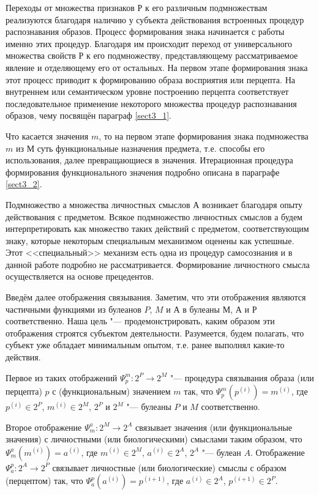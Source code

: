 Переходы от множества признаков $Р$ к его различным подмножествам реализуются благодаря наличию у субъекта действования встроенных процедур распознавания образов. Процесс формирования знака начинается с работы именно этих процедур. Благодаря им происходит переход от универсального множества свойств $Р$ к его подмножеству, представляющему рассматриваемое явление и отделяющему его от остальных. На первом этапе формирования знака этот процесс приводит к формированию образа восприятия или перцепта. На внутреннем или семантическом уровне построению перцепта соответствует последовательное применение некоторого множества процедур распознавания образов, чему посвящён параграф \ref{sect3_1}.

Что касается значения $m$, то на первом этапе формирования знака подмножества $m$ из $М$ суть функциональные назначения предмета, т.е. способы его использования, далее превращающиеся в значения. Итерационная процедура формирования функционального значения подробно описана в параграфе \ref{sect3_2}.

Подмножество $а$ множества личностных смыслов $А$ возникает благодаря опыту действования с предметом. Всякое подмножество личностных смыслов а будем интерпретировать как множество таких действий с предметом, соответствующим знаку, которые некоторым специальным механизмом оценены как успешные. Этот <<специальный>> механизм есть одна из процедур самосознания и в данной работе подробно не рассматривается. Формирование личностного смысла осуществляется на основе прецедентов.

Введём далее отображения связывания. Заметим, что эти отображения являются частичными функциями из булеанов $P$, $M$ и $А$ в булеаны $М$, $А$ и $Р$ соответственно. Наша цель "--- продемонстрировать, каким образом эти отображения строятся субъектом деятельности. Разумеется, будем полагать, что субъект уже обладает минимальным опытом, т.е. ранее выполнял какие-то действия.

Первое из таких отображений $\Psi_p^m:2^P\rightarrow 2^M$ "--- процедура связывания образа (или перцепта) $p$ с (функциональным) значением $m$ так, что $\Psi_p^m(p^{(i)})=m^{(i)}$, где $p^{(i)}\in 2^P$, $m^{(i)}\in 2^M$, $2^P$ и $2^M$ "--- булеаны $P$ и $M$ соответственно.

Второе отображение $\Psi_m^a:2^M\rightarrow 2^A$ связывает значения (или функциональные значения) с личностными (или биологическими) смыслами таким образом, что $\Psi_m^a(m^{(i)})=a^{(i)}$, где $m^{(i)}\in 2^M$, $a^{(i)}\in 2^A$, $2^A$ "--- булеан $A$. Отображение $\Psi_a^p:2^A\rightarrow 2^P$ связывает личностные (или биологические) смыслы с образом (перцептом) так, что $\Psi_a^p(a^{(i)})=p^{(i+1)}$, где $a^{(i)}\in 2^A$, $p^{(i+1)}\in 2^P$.

